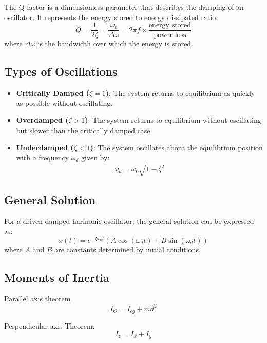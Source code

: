 \documentclass[12pt,a4paper]{article}
\begin{document}
	The Q factor is a dimensionless parameter that describes the damping of an oscillator. It represents the energy stored to energy dissipated ratio. 
	\[
	Q = \frac{1}{2\zeta} = \frac{\omega_0}{\Delta \omega} = 2 \pi f \times \frac{\text{energy stored}}{\text{power loss}}
	\]
	where \( \Delta \omega \) is the bandwidth over which the energy is stored.
	
	\subsection*{Types of Oscillations}
	
	\begin{itemize}
		\item \textbf{Critically Damped (\( \zeta = 1 \))}: The system returns to equilibrium as quickly as possible without oscillating.
		\item \textbf{Overdamped (\( \zeta > 1 \))}: The system returns to equilibrium without oscillating but slower than the critically damped case.
		\item \textbf{Underdamped (\( \zeta < 1 \))}: The system oscillates about the equilibrium position with a frequency \( \omega_d \) given by:
		\[
		\omega_d = \omega_0 \sqrt{1 - \zeta^2}
		\]
	\end{itemize}
	
	\subsection*{General Solution}
	
	For a driven damped harmonic oscillator, the general solution can be expressed as:
	\[
	x(t) = e^{-\zeta \omega_0 t} \left( A \cos(\omega_d t) + B \sin(\omega_d t) \right)
	\]
	where \( A \) and \( B \) are constants determined by initial conditions.
	
\subsection*{Moments of Inertia}
Parallel axis theorem
\begin{equation}
	I_O = I_{cg} + m d^2
\end{equation}

Perpendicular axis Theorem: \begin{equation}
	I_{z}=I_{x}+I_{y}
\end{equation}
\end{document}
